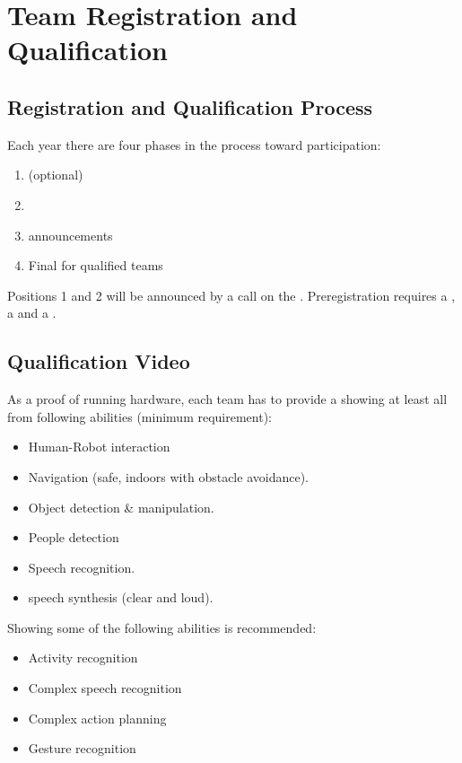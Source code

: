 \section{Team Registration and Qualification}


\subsection{Registration and Qualification Process}
\label{rule:participation}

Each year there are four phases in the process toward participation:
\begin{enumerate}
	\item {} (optional)
	\item {} 
	\item {} announcements
	\item Final  for qualified teams
\end{enumerate}
Positions 1 and 2 will be announced by a call on the . Preregistration requires a , a  and a .

\subsection{Qualification Video}
As a proof of running hardware, each team has to provide a  showing at least all from following abilities (minimum requirement):
\begin{itemize}
	\item Human-Robot interaction
	\item Navigation (safe, indoors with obstacle avoidance).
	\item Object detection \& manipulation.
	\item People detection
	\item Speech recognition.
	\item speech synthesis (clear and loud).
\end{itemize}

Showing some of the following abilities is recommended:
\begin{itemize}
	\item Activity recognition
	\item Complex speech recognition
	\item Complex action planning
	\item Gesture recognition
\end{itemize}

